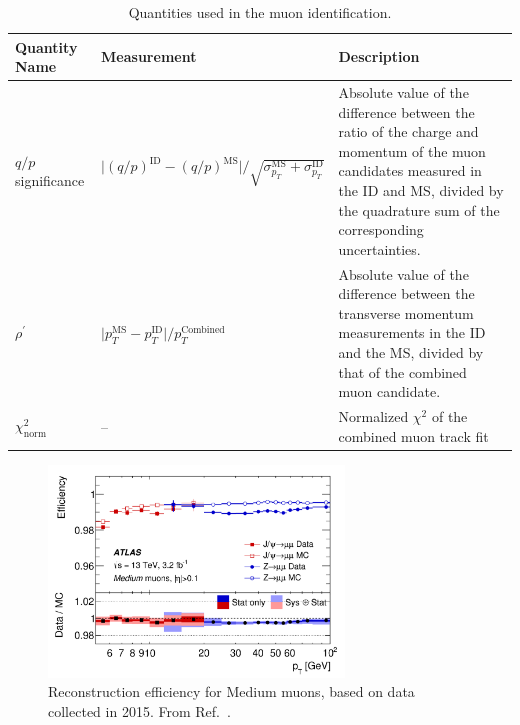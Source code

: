\begin{table}[!htb]
    \begin{center}
        \caption{
            Quantities used in the muon identification.
        }
        \label{tab:muon_id_vars}
        \begin{tabularx}{\textwidth}{l|X|X}
        \hline
        \hline
        \textbf{Quantity Name} & \textbf{Measurement} & \textbf{Description} \\
        \hline
        $q/p$ significance & $\lvert (q/p)^{\text{ID}} - (q/p)^{\text{MS}} \rvert / \sqrt{ \sigma_{p_T}^{\text{MS}} + \sigma_{p_T}^{\text{ID}}}$ &
                Absolute value of the difference between the ratio of the charge and momentum of the muon candidates measured in the ID and MS,
                divided by the quadrature sum of the corresponding uncertainties. \\
        \hline
        $\rho^{\prime}$ & $\lvert p_T^{\text{MS}} - p_T^{\text{ID}} \rvert / p_T^{\text{Combined}}$ &
                Absolute value of the difference between the transverse momentum measurements in the ID and the MS,
                divided by that of the combined muon candidate. \\
        \hline
        $\chi^2_{\text{norm}}$ & -- & Normalized $\chi^2$ of the combined muon track fit \\
        \hline
        \hline
        \end{tabularx}
    \end{center}
\end{table}

\begin{figure}[!htb]
    \begin{center}
        \includegraphics[width=0.7\textwidth]{figures/chapter3/muon/muon_reco_eff_medium}
        \caption{
            Reconstruction efficiency for Medium muons, based on data collected in 2015.
            From Ref.~\cite{Aad:2016jkr}.
        }
        \label{fig:muon_reco_eff}
    \end{center}
\end{figure}

\FloatBarrier

